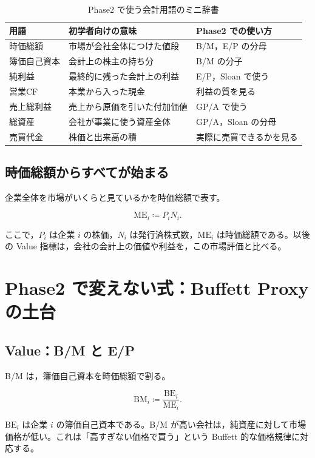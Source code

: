 \documentclass[a4paper,10pt]{article}
\newcommand{\ME}{\mathrm{ME}}
\newcommand{\BE}{\mathrm{BE}}
\newcommand{\BM}{\mathrm{BM}}
\newcommand{\1}{\mathbf{1}}
\begin{document}
\begin{table}[tbp]
\caption{Phase2 で使う会計用語のミニ辞書}
\label{tab:dictionary}
\centering
\begin{tabular}{p{30mm}p{55mm}p{55mm}}
\toprule
用語 & 初学者向けの意味 & Phase2 での使い方 \\
\midrule
時価総額 & 市場が会社全体につけた値段 & B/M，E/P の分母 \\
簿価自己資本 & 会計上の株主の持ち分 & B/M の分子 \\
純利益 & 最終的に残った会計上の利益 & E/P，Sloan で使う \\
営業CF & 本業から入った現金 & 利益の質を見る \\
売上総利益 & 売上から原価を引いた付加価値 & GP/A で使う \\
総資産 & 会社が事業に使う資産全体 & GP/A，Sloan の分母 \\
売買代金 & 株価と出来高の積 & 実際に売買できるかを見る \\
\bottomrule
\end{tabular}
\end{table}

\subsection{時価総額からすべてが始まる}
企業全体を市場がいくらと見ているかを時価総額で表す。

\begin{equation}
\ME_i \coloneqq P_i N_i .
\label{eq:market-equity}
\end{equation}

ここで，$P_i$ は企業 $i$ の株価，$N_i$ は発行済株式数，$\ME_i$ は時価総額である。以後の Value 指標は，会社の会計上の価値や利益を，この市場評価と比べる。

\section{Phase2 で変えない式：Buffett Proxy の土台}

\subsection{Value：B/M と E/P}
B/M は，簿価自己資本を時価総額で割る。

\begin{equation}
\BM_i \coloneqq \frac{\BE_i}{\ME_i} .
\label{eq:bm}
\end{equation}

$\BE_i$ は企業 $i$ の簿価自己資本である。B/M が高い会社は，純資産に対して市場価格が低い。これは「高すぎない価格で買う」という Buffett 的な価格規律に対応する。
\end{document}
